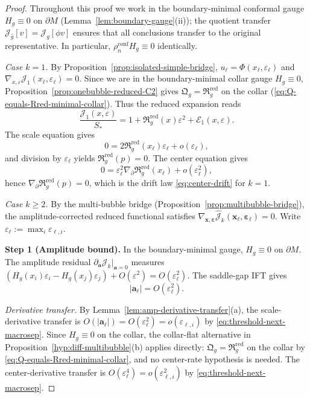 \documentclass[11pt,reqno,a4paper]{amsart}
\numberwithin{equation}{section}
\theoremstyle{plain}
\theoremstyle{remark}
\theoremstyle{plain}
\begin{document}
\begin{proof}
Throughout this proof we work in the boundary-minimal conformal gauge
$H_g\equiv0$ on $\partial M$ (Lemma~\ref{lem:boundary-gauge}(ii));
the quotient transfer $\mathcal J_{\hat g}[v]=\mathcal J_g[\phi v]$
ensures that all conclusions transfer to the original representative.
In particular, $\rho_n^{\mathrm{conf}}H_g\equiv0$ identically.

\smallskip
\emph{Case $k=1$.}
By Proposition~\ref{prop:isolated-simple-bridge},
$u_\ell=\Phi(x_\ell,\varepsilon_\ell)$ and
$\nabla_{x,\varepsilon}\mathcal J_1(x_\ell,\varepsilon_\ell)=0$.
Since we are in the boundary-minimal collar gauge $H_g\equiv0$,
Proposition~\ref{prop:onebubble-reduced-C2} gives
$\mathfrak Q_g=\mathfrak R_g^{\mathrm{red}}$ on the collar
(\eqref{eq:Q-equals-Rred-minimal-collar}).  Thus the reduced expansion reads
\[
\frac{\mathcal J_1(x,\varepsilon)}{S_\ast}
=1+\mathfrak R_g^{\mathrm{red}}(x)\varepsilon^2+
\mathcal E_1(x,\varepsilon).
\]
The scale equation gives
\[
0=2\mathfrak R_g^{\mathrm{red}}(x_\ell)\varepsilon_\ell+o(\varepsilon_\ell),
\]
and division by $\varepsilon_\ell$ yields $\mathfrak R_g^{\mathrm{red}}(p)=0$.
The center equation gives
\[
0=\varepsilon_\ell^2\nabla_\partial\mathfrak R_g^{\mathrm{red}}(x_\ell)+o(\varepsilon_\ell^2),
\]
hence $\nabla_\partial\mathfrak R_g^{\mathrm{red}}(p)=0$,
which is the drift law \eqref{eq:center-drift} for $k=1$.

\smallskip
\emph{Case $k\ge2$.}
By the multi-bubble bridge
(Proposition~\ref{prop:multibubble-bridge}),
the amplitude-corrected reduced functional satisfies
$\nabla_{\mathbf x,\boldsymbol\varepsilon}\hat{\mathcal J}_k
(\mathbf x_\ell,\boldsymbol\varepsilon_\ell)=0$.
Write $\varepsilon_\ell:=\max_i\varepsilon_{\ell,i}$.

\smallskip\noindent
\textbf{Step 1 (Amplitude bound).}
In the boundary-minimal gauge, $H_g\equiv0$ on $\partial M$.
The amplitude residual $\partial_{\mathbf a}\mathcal J_k|_{\mathbf a=0}$
measures $(H_g(x_i)\varepsilon_i-H_g(x_j)\varepsilon_j)+O(\varepsilon^2)
=O(\varepsilon_\ell^2)$.
The saddle-gap IFT gives
\begin{equation}\label{eq:a-from-D}
|\mathbf a_\ell|=O(\varepsilon_\ell^2).
\end{equation}

\emph{Derivative transfer.}
By Lemma~\ref{lem:amp-derivative-transfer}\textup{(a)},
the scale-derivative transfer is $O(|\mathbf a_\ell|)=O(\varepsilon_\ell^2)=o(\varepsilon_{\ell,i})$
by \eqref{eq:threshold-next-macrosep}.
Since $H_g\equiv0$ on the collar, the collar-flat
alternative in Proposition~\ref{hyp:diff-multibubble}\textup{(b)} applies
directly: $\mathfrak Q_g=\mathfrak R_g^{\mathrm{red}}$ on the collar
by \eqref{eq:Q-equals-Rred-minimal-collar}, and no center-rate hypothesis is
needed.  The center-derivative transfer is $O(\varepsilon_\ell^4)=o(\varepsilon_{\ell,i}^2)$
by \eqref{eq:threshold-next-macrosep}.


\end{proof}
\end{document}
